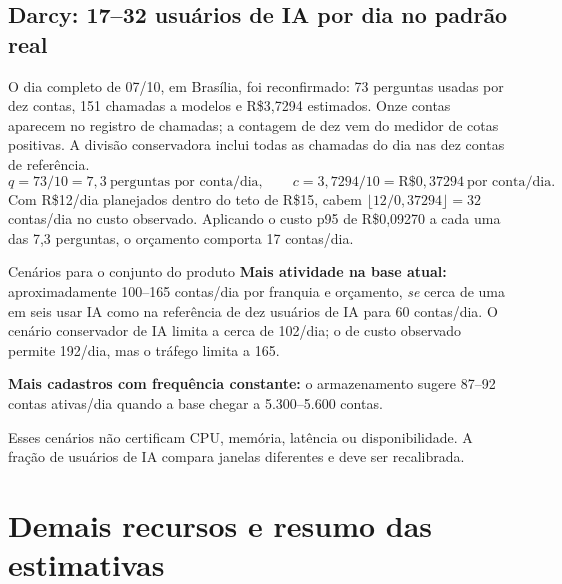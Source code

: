 \documentclass[10pt,a4paper]{article}
\newcommand{\pagechapter}[1]{\clearpage\section{#1}}
\begin{document}
\subsection{Darcy: 17–32 usuários de IA por dia no padrão real}
O dia completo de 07/10, em Brasília, foi reconfirmado: 73 perguntas usadas por dez contas, 151 chamadas a modelos e R\$3,7294 estimados. Onze contas aparecem no registro de chamadas; a contagem de dez vem do medidor de cotas positivas. A divisão conservadora inclui todas as chamadas do dia nas dez contas de referência.
\[
q=73/10=7{,}3\ \text{perguntas por conta/dia},\qquad
c=3{,}7294/10=\mathrm{R\$}0{,}37294\ \text{por conta/dia}.
\]
Com R\$12/dia planejados dentro do teto de R\$15, cabem \(\lfloor12/0{,}37294\rfloor=32\) contas/dia no custo observado. Aplicando o custo p95 de R\$0,09270 a cada uma das 7,3 perguntas, o orçamento comporta 17 contas/dia.

\begin{NFBox}{Cenários para o conjunto do produto}
\textbf{Mais atividade na base atual:} aproximadamente 100–165 contas/dia por franquia e orçamento, \emph{se} cerca de uma em seis usar IA como na referência de dez usuários de IA para 60 contas/dia. O cenário conservador de IA limita a cerca de 102/dia; o de custo observado permite 192/dia, mas o tráfego limita a 165.\par
\textbf{Mais cadastros com frequência constante:} o armazenamento sugere 87–92 contas ativas/dia quando a base chegar a 5.300–5.600 contas.\par
Esses cenários não certificam CPU, memória, latência ou disponibilidade. A fração de usuários de IA compara janelas diferentes e deve ser recalibrada.
\end{NFBox}

\pagechapter{Demais recursos e resumo das estimativas}
\end{document}
